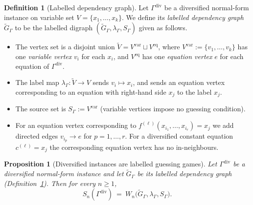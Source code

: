 \documentclass[11pt]{article}
\theoremstyle{plain}
\newtheorem{proposition}[theorem]{Proposition}
\theoremstyle{definition}
\theoremstyle{definition}
\newtheorem{definition}[theorem]{Definition}
\theoremstyle{remark}
\newcommand{\Sn}{S_n}
\begin{document}
\begin{definition}[Labelled dependency graph]
\label{def:labelled-dep-graph}
Let $\Gamma^{\mathrm{div}}$ be a diversified normal-form instance on variable set
$V=\{x_1,\dots,x_k\}$.
We define its \emph{labelled dependency graph} $\widetilde G_{\Gamma}$ to be the labelled digraph
$(\widetilde G_{\Gamma},\lambda_{\Gamma},S_{\Gamma})$ given as follows.

\begin{itemize}
\item The vertex set is a disjoint union $\widetilde V=V^{\mathrm{var}}\sqcup V^{\mathrm{eq}}$, where
$V^{\mathrm{var}}:=\{v_1,\dots,v_k\}$ has one \emph{variable vertex} $v_i$ for each $x_i$, and $V^{\mathrm{eq}}$ has one
\emph{equation vertex} $e$ for each equation of $\Gamma^{\mathrm{div}}$.
\item The label map $\lambda_{\Gamma}:\widetilde V\to V$ sends $v_i\mapsto x_i$, and sends an equation vertex
corresponding to an equation with right-hand side $x_j$ to the label $x_j$.
\item The source set is $S_{\Gamma}:=V^{\mathrm{var}}$ (variable vertices impose no guessing condition).
\item For an equation vertex corresponding to
$f^{(\ell)}(x_{i_1},\dots,x_{i_r})=x_j$ we add directed edges $v_{i_p}\to e$ for $p=1,\dots,r$.
For a diversified constant equation $c^{(\ell)}=x_j$ the corresponding equation vertex has no in-neighbours.
\end{itemize}
\end{definition}

\begin{proposition}[Diversified instances are labelled guessing games]
\label{prop:div-is-labelled-guessing}
Let $\Gamma^{\mathrm{div}}$ be a diversified normal-form instance and let $\widetilde G_{\Gamma}$ be its labelled
dependency graph (Definition~\ref{def:labelled-dep-graph}).
Then for every $n\ge 1$,
\[
  \Sn(\Gamma^{\mathrm{div}})\ =\ W_n\bigl(\widetilde G_{\Gamma},\lambda_{\Gamma},S_{\Gamma}\bigr).
\]
\end{proposition}
\end{document}
